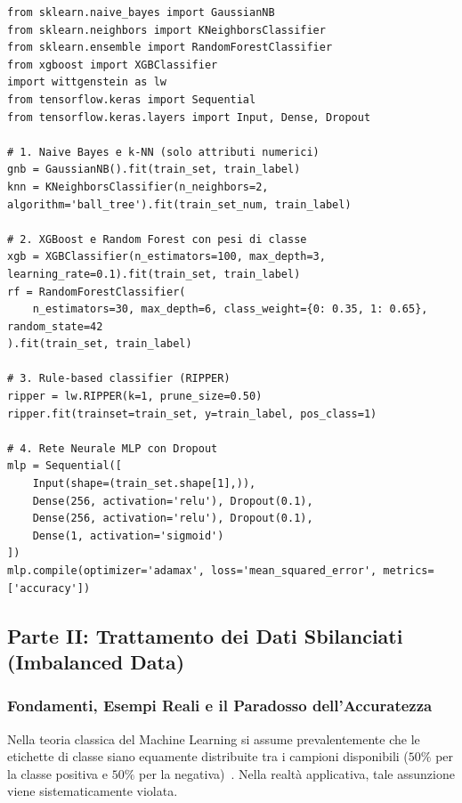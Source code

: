 \begin{lstlisting}[style=pythoncode, caption={Confronto implementativo di classificatori supervisionati (Na\"ive Bayes, $k$-NN, XGBoost, Random Forest pesata, RIPPER e Rete Neurale con Dropout).}]
from sklearn.naive_bayes import GaussianNB
from sklearn.neighbors import KNeighborsClassifier
from sklearn.ensemble import RandomForestClassifier
from xgboost import XGBClassifier
import wittgenstein as lw
from tensorflow.keras import Sequential
from tensorflow.keras.layers import Input, Dense, Dropout

# 1. Naive Bayes e k-NN (solo attributi numerici)
gnb = GaussianNB().fit(train_set, train_label)
knn = KNeighborsClassifier(n_neighbors=2, algorithm='ball_tree').fit(train_set_num, train_label)

# 2. XGBoost e Random Forest con pesi di classe
xgb = XGBClassifier(n_estimators=100, max_depth=3, learning_rate=0.1).fit(train_set, train_label)
rf = RandomForestClassifier(
    n_estimators=30, max_depth=6, class_weight={0: 0.35, 1: 0.65}, random_state=42
).fit(train_set, train_label)

# 3. Rule-based classifier (RIPPER)
ripper = lw.RIPPER(k=1, prune_size=0.50)
ripper.fit(trainset=train_set, y=train_label, pos_class=1)

# 4. Rete Neurale MLP con Dropout
mlp = Sequential([
    Input(shape=(train_set.shape[1],)),
    Dense(256, activation='relu'), Dropout(0.1),
    Dense(256, activation='relu'), Dropout(0.1),
    Dense(1, activation='sigmoid')
])
mlp.compile(optimizer='adamax', loss='mean_squared_error', metrics=['accuracy'])
\end{lstlisting}
\FloatBarrier
\subsection{Parte II: Trattamento dei Dati Sbilanciati (Imbalanced Data)}
\label{sec:dm-imbalanced-data}

\FloatBarrier
\subsubsection{Fondamenti, Esempi Reali e il Paradosso dell'Accuratezza}
\label{subsec:dm-imbalanced-paradox}

Nella teoria classica del Machine Learning si assume prevalentemente che le etichette di classe siano equamente distribuite tra i campioni disponibili ($50\%$ per la classe positiva e $50\%$ per la negativa)~\cite{tan2018}. Nella realtà applicativa, tale assunzione viene sistematicamente violata.

